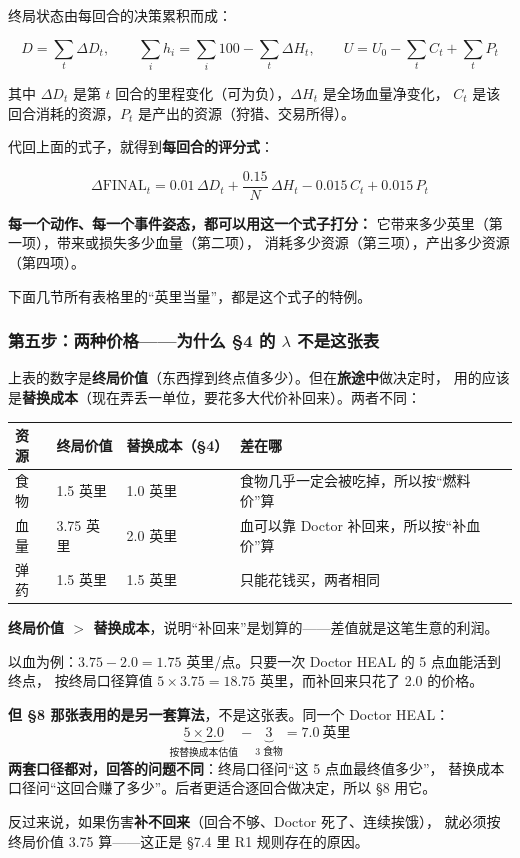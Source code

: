 \documentclass[UTF8,11pt,a4paper]{ctexart}
\begin{document}
终局状态由每回合的决策累积而成：

\[
D=\sum_t \Delta D_t,\qquad
\sum_i h_i=\sum_i 100-\sum_t \Delta H_t,\qquad
U=U_0-\sum_t C_t+\sum_t P_t
\]

其中 $\Delta D_t$ 是第 $t$ 回合的里程变化（可为负），$\Delta H_t$ 是全场血量净变化，
$C_t$ 是该回合消耗的资源，$P_t$ 是产出的资源（狩猎、交易所得）。

代回上面的式子，就得到\textbf{每回合的评分式}：

\[
\boxed{\ \Delta\text{FINAL}_t=0.01\,\Delta D_t+\frac{0.15}{N}\,\Delta H_t-0.015\,C_t+0.015\,P_t\ }
\]

\begin{keybox}[title={这一行就是整份文档的总结}]
\textbf{每一个动作、每一个事件姿态，都可以用这一个式子打分：}
它带来多少英里（第一项），带来或损失多少血量（第二项），
消耗多少资源（第三项），产出多少资源（第四项）。

下面几节所有表格里的“英里当量”，都是这个式子的特例。
\end{keybox}

\subsubsection*{第五步：两种价格——为什么 §4 的 $\lambda$ 不是这张表}

上表的数字是\textbf{终局价值}（东西撑到终点值多少）。但在\textbf{旅途中}做决定时，
用的应该是\textbf{替换成本}（现在弄丢一单位，要花多大代价补回来）。两者不同：

\begin{center}
\small
\begin{tabular}{@{}p{2.0cm}p{3.4cm}p{3.4cm}p{5.0cm}@{}}
\toprule
\textbf{资源} & \textbf{终局价值} & \textbf{替换成本（§4）} & \textbf{差在哪} \\
\midrule
食物 & 1.5 英里 & 1.0 英里 & 食物几乎一定会被吃掉，所以按“燃料价”算 \\
血量 & 3.75 英里 & 2.0 英里 & 血可以靠 Doctor 补回来，所以按“补血价”算 \\
弹药 & 1.5 英里 & 1.5 英里 & 只能花钱买，两者相同 \\
\bottomrule
\end{tabular}
\end{center}

\begin{keybox}[title={为什么这个区分很重要}]
\textbf{终局价值 $>$ 替换成本}，说明“补回来”是划算的——差值就是这笔生意的利润。

以血为例：$3.75-2.0=1.75$ 英里/点。只要一次 Doctor HEAL 的 5 点血能活到终点，
按终局口径算值 $5\times3.75=18.75$ 英里，而补回来只花了 2.0 的价格。

\smallskip
\noindent\textbf{但 §8 那张表用的是另一套算法}，不是这张表。同一个 Doctor HEAL：
\[
\underbrace{5\times2.0}_{\text{按替换成本估值}}-\underbrace{3}_{\text{3 食物}}=7.0\ \text{英里}
\]
\textbf{两套口径都对，回答的问题不同}：终局口径问“这 5 点血最终值多少”，
替换成本口径问“这回合赚了多少”。后者更适合逐回合做决定，所以 §8 用它。

反过来说，如果伤害\textbf{补不回来}（回合不够、Doctor 死了、连续挨饿），
就必须按终局价值 3.75 算——这正是 §7.4 里 R1 规则存在的原因。
\end{keybox}
\end{document}
